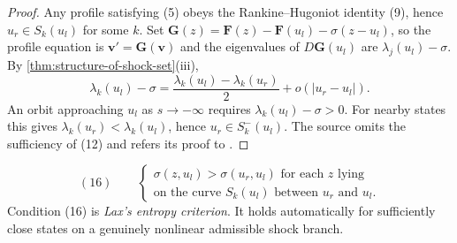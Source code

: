 \begin{proof}
\sketch Any profile satisfying (5) obeys the Rankine--Hugoniot identity (9), hence $u_r\in S_k(u_l)$ for some $k$. Set
$\mathbf G(z)=\mathbf F(z)-\mathbf F(u_l)-\sigma(z-u_l)$, so the profile equation is $\mathbf v'=\mathbf G(\mathbf v)$ and the eigenvalues of $D\mathbf G(u_l)$ are $\lambda_j(u_l)-\sigma$. By \cref{thm:structure-of-shock-set}(iii),
\[
\lambda_k(u_l)-\sigma
=\frac{\lambda_k(u_l)-\lambda_k(u_r)}{2}+o(|u_r-u_l|).
\]
An orbit approaching $u_l$ as $s\to-\infty$ requires $\lambda_k(u_l)-\sigma>0$. For nearby states this gives $\lambda_k(u_r)<\lambda_k(u_l)$, hence $u_r\in S_k^-(u_l)$. The source omits the sufficiency of (12) and refers its proof to \cite{MajdaPego1985}.
\end{proof}

\begin{definition}
\label{def:lax-entropy-criterion-general}

$$(16) \qquad \begin{cases} \sigma(z,u_l) > \sigma(u_r,u_l) \text{ for each } z \text{ lying} \\ \text{on the curve } S_k(u_l) \text{ between } u_r \text{ and } u_l. \end{cases}$$
Condition (16) is \textit{Lax's entropy criterion}. It holds automatically for sufficiently close states on a genuinely nonlinear admissible shock branch.
\end{definition}

